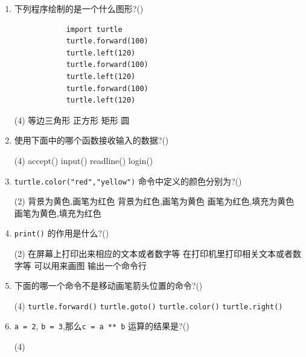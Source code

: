 \documentclass[11pt]{ctexart}
\begin{document}
\begin{enumerate}
        \item 下列程序绘制的是一个什么图形?(\qquad)
        \begin{lstlisting}
            import turtle
            turtle.forward(100)
            turtle.left(120)
            turtle.forward(100)
            turtle.left(120)
            turtle.forward(100)
            turtle.left(120)
        \end{lstlisting}
        \begin{tasks}(4)
            \task 等边三角形
            \task 正方形
            \task 矩形
            \task 圆
        \end{tasks}

        \item 使用下面中的哪个函数接收输入的数据?(\qquad)
        \begin{tasks}(4)
            \task accept()
            \task input()
            \task readline()
            \task login()
        \end{tasks}

        \item \lstinline{turtle.color("red","yellow")} 命令中定义的颜色分别为?(\qquad)
        \begin{tasks}(2)
            \task 背景为黄色,画笔为红色
            \task 背景为红色,画笔为黄色
            \task 画笔为红色,填充为黄色
            \task 画笔为黄色,填充为红色
        \end{tasks}

        \item \lstinline{print()} 的作用是什么?(\qquad)
        \begin{tasks}(2)
            \task 在屏幕上打印出来相应的文本或者数字等
            \task 在打印机里打印相关文本或者数字等
            \task 可以用来画图
            \task 输出一个命令行
        \end{tasks}

        \item 下面的哪一个命令不是移动画笔箭头位置的命令?(\qquad)
        \begin{tasks}(4)
            \task \lstinline{turtle.forward()}
            \task \lstinline{turtle.goto()}
            \task \lstinline{turtle.color()}
            \task \lstinline{turtle.right()}
        \end{tasks}   

        \item \lstinline{a = 2}, \lstinline{b = 3},那么\lstinline{c = a ** b} 运算的结果是?(\qquad)
        \begin{tasks}(4)
        \end{tasks}


\end{enumerate}
\end{document}
